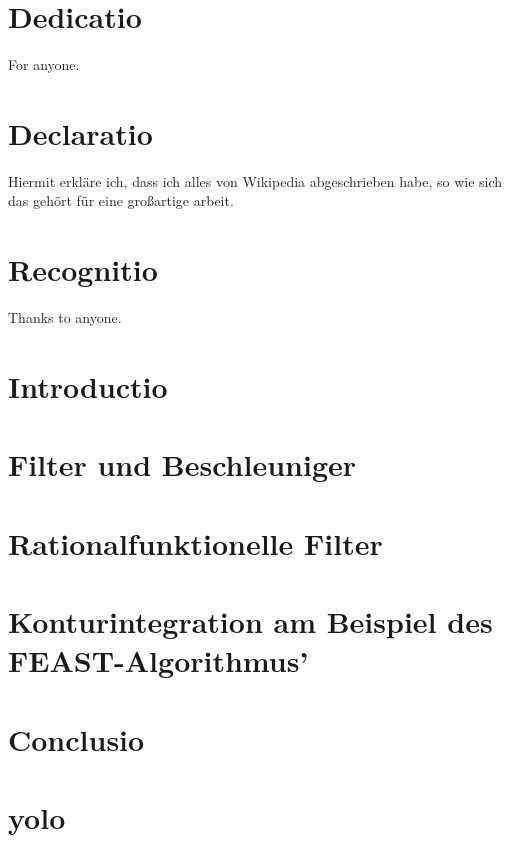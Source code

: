 \documentclass[12pt, twoside]{report} %
\begin{document}


\chapter*{Dedicatio}
For anyone.

\chapter*{Declaratio}
Hiermit erkläre ich, dass ich alles von Wikipedia abgeschrieben habe, so
wie sich das gehört für eine großartige arbeit.

\chapter*{Recognitio}
Thanks to anyone.

\tableofcontents

\chapter{Introductio}


\chapter{Filter und Beschleuniger}


\chapter{Rationalfunktionelle Filter}


\chapter{Konturintegration am Beispiel des FEAST-Algorithmus'}


\chapter{Conclusio}


\appendix
\chapter{yolo}


\printbibliography
\end{document}
